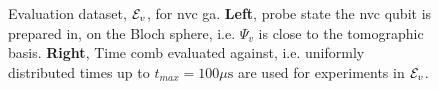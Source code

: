 \begin{figure}
    \begin{center}
        \qquad
    \end{center}
    \caption[Evaluation dataset for nitrogen-vacancy centre genetic algorithm]{
        Evaluation dataset, ${ \mathcal{E} }_v$, for \acrlong{nvc} \acrlong{ga}. 
        \textbf{Left}, \Gls{probe} state the \gls{nvc}  qubit is prepared in, on the Bloch sphere, 
            i.e. $\Psi_v$ is close to the tomographic basis. 
        \textbf{Right}, Time comb evaluated against, i.e. uniformly distributed times up to $t_{max} = 100 \mu \textrm{s}$ 
            are used for \glspl{experiment} in ${ \mathcal{E} }_v$. 
        }
    \label{fig:nv_ga_eval_data}
\end{figure}    

\par 


